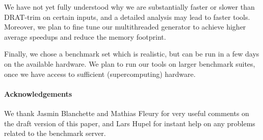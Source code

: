 \documentclass{llncs}
\begin{document}
We have not yet fully understood why we are substantially faster or slower than DRAT-trim on certain inputs,
and a detailed analysis may lead to faster tools. Moreover, we plan to fine tune our multithreaded generator to achieve higher average speedups and reduce the memory footprint.

Finally, we chose a benchmark set which is realistic, but can be run in a few days on the available hardware.
We plan to run our tools on larger benchmark suites, once we have access to sufficient (supercomputing) hardware.

\paragraph{Acknowledgements} We thank Jasmin Blanchette and Mathias Fleury for very useful comments on the draft version of this paper, 
and Lars Hupel for instant help on any problems related to the benchmark server.

\clearpage



\end{document}
